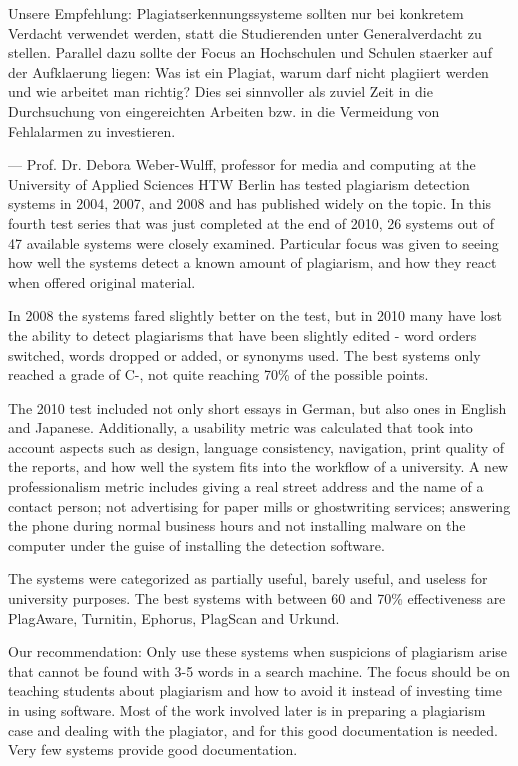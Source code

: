 Unsere Empfehlung: Plagiatserkennungssysteme sollten nur bei konkretem Verdacht verwendet werden, statt die Studierenden unter Generalverdacht zu stellen. Parallel dazu sollte der Focus an Hochschulen und Schulen staerker auf der Aufklaerung liegen: Was ist ein Plagiat, warum darf nicht plagiiert werden und wie arbeitet man richtig? Dies sei sinnvoller als zuviel Zeit in die Durchsuchung von eingereichten Arbeiten bzw. in die Vermeidung von Fehlalarmen zu investieren.

---
Prof. Dr. Debora Weber-Wulff, professor for media and computing at the University of Applied Sciences HTW Berlin has tested plagiarism detection systems in 2004, 2007, and 2008 and has published widely on the topic. In this fourth test series that was just completed at the end of 2010, 26 systems out of 47 available systems were closely examined. Particular focus was given to seeing how well the systems detect a known amount of plagiarism, and how they react when offered original material.

In 2008 the systems fared slightly better on the test, but in 2010 many have lost the ability to detect plagiarisms that have been slightly edited - word orders switched, words dropped or added, or synonyms used. The best systems only reached a grade of C-, not quite reaching 70\% of the possible points.

The 2010 test included not only short essays in German, but also ones in English and Japanese. Additionally, a usability metric was calculated that took into account aspects such as design, language consistency, navigation, print quality of the reports, and how well the system fits into the workflow of a university. A new professionalism metric includes giving a real street address and the name of a contact person; not advertising for paper mills or ghostwriting services; answering the phone during normal business hours and not installing malware on the computer under the guise of installing the detection software.

The systems were categorized as partially useful, barely useful, and useless for university purposes. The best systems with between 60 and 70\% effectiveness are PlagAware, Turnitin, Ephorus, PlagScan and Urkund.

Our recommendation: Only use these systems when suspicions of plagiarism arise that cannot be found with 3-5 words in a search machine. The focus should be on teaching students about plagiarism and how to avoid it instead of investing time in using software. Most of the work involved later is in preparing a plagiarism case and dealing with the plagiator, and for this good documentation is needed. Very few systems provide good documentation.





